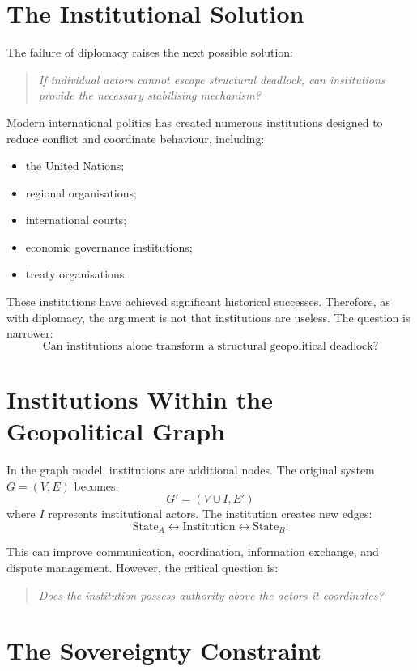 \documentclass[11pt,openany]{book}
\theoremstyle{plain}
\theoremstyle{definition}
\begin{document}
\section*{The Institutional Solution}

The failure of diplomacy raises the next possible solution:
\begin{quote}
\textit{If individual actors cannot escape structural deadlock, can institutions provide the necessary stabilising mechanism?}
\end{quote}

Modern international politics has created numerous institutions designed to reduce conflict and coordinate behaviour, including:
\begin{itemize}
\item the United Nations;
\item regional organisations;
\item international courts;
\item economic governance institutions;
\item treaty organisations.
\end{itemize}

These institutions have achieved significant historical successes. Therefore, as with diplomacy, the argument is not that institutions are useless. The question is narrower:
\[
\boxed{
\text{Can institutions alone transform a structural geopolitical deadlock?}
}
\]

\section*{Institutions Within the Geopolitical Graph}

In the graph model, institutions are additional nodes. The original system \(G = (V, E)\) becomes:
\[
G' = (V \cup I, E')
\]
where \(I\) represents institutional actors. The institution creates new edges:
\[
\text{State}_A \longleftrightarrow \text{Institution} \longleftrightarrow \text{State}_B.
\]

This can improve communication, coordination, information exchange, and dispute management. However, the critical question is:
\begin{quote}
\textit{Does the institution possess authority above the actors it coordinates?}
\end{quote}

\section*{The Sovereignty Constraint}
\end{document}
